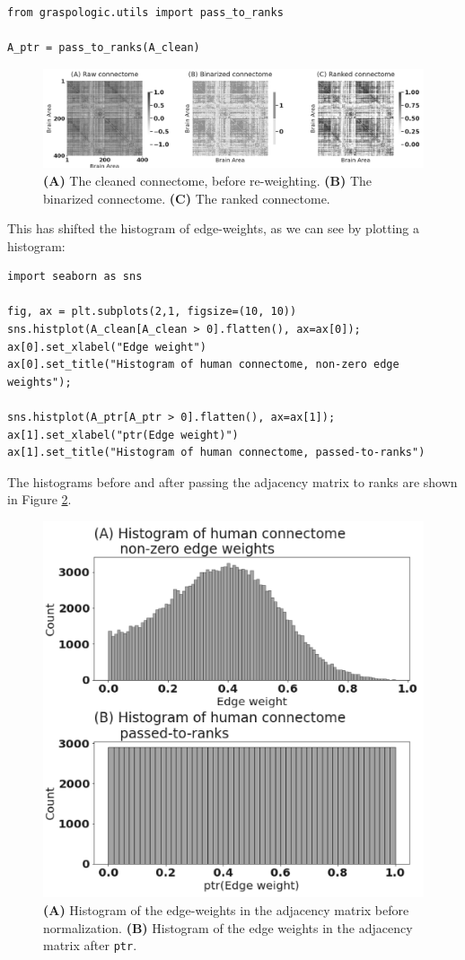 \begin{lstlisting}[style=python]
from graspologic.utils import pass_to_ranks

A_ptr = pass_to_ranks(A_clean)
\end{lstlisting}
\begin{figure}[h]
    \centering
    \includegraphics[width=\linewidth]{foundations/ch2/Images/cleaning_connectomes.png}
    \caption[Re-weighting connectome edge-weights]{\textbf{(A)} The cleaned connectome, before re-weighting. \textbf{(B)} The binarized connectome. \textbf{(C)} The ranked connectome.}
    \label{fig:ch2:cleaned_connectomes}
\end{figure}

This has shifted the histogram of edge-weights, as we can see by plotting a histogram:

\begin{lstlisting}[style=python]
import seaborn as sns

fig, ax = plt.subplots(2,1, figsize=(10, 10))
sns.histplot(A_clean[A_clean > 0].flatten(), ax=ax[0]);
ax[0].set_xlabel("Edge weight")
ax[0].set_title("Histogram of human connectome, non-zero edge weights");

sns.histplot(A_ptr[A_ptr > 0].flatten(), ax=ax[1]);
ax[1].set_xlabel("ptr(Edge weight)")
ax[1].set_title("Histogram of human connectome, passed-to-ranks")
\end{lstlisting}
The histograms before and after passing the adjacency matrix to ranks are shown in Figure \ref{fig:ch2:ptrhists}.

\begin{figure}[h]
    \centering
    \includegraphics[width=0.6\linewidth]{foundations/ch2/Images/ptrhists.png}
    \caption[Histograms of connectome edge weights]{\textbf{(A)} Histogram of the edge-weights in the adjacency matrix before normalization. \textbf{(B)} Histogram of the edge weights in the adjacency matrix after \texttt{ptr}.}
    \label{fig:ch2:ptrhists}
\end{figure}

